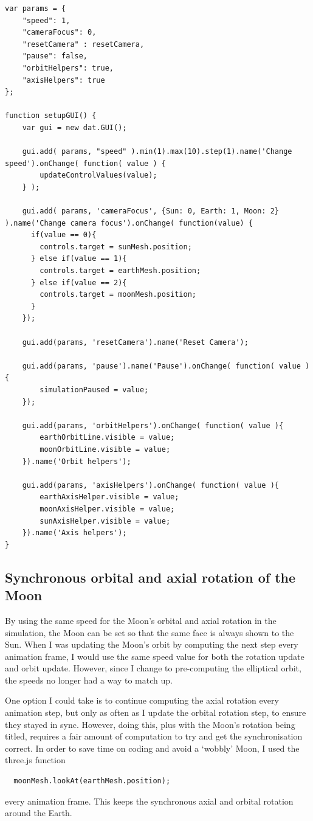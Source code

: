 \documentclass[12pt]{article}
\begin{document}
\begin{lstlisting}
var params = {
    "speed": 1,
    "cameraFocus": 0,
    "resetCamera" : resetCamera,
    "pause": false,
    "orbitHelpers": true,
    "axisHelpers": true
};

function setupGUI() {
    var gui = new dat.GUI();

    gui.add( params, "speed" ).min(1).max(10).step(1).name('Change speed').onChange( function( value ) {
        updateControlValues(value);
    } );

    gui.add( params, 'cameraFocus', {Sun: 0, Earth: 1, Moon: 2} ).name('Change camera focus').onChange( function(value) {
      if(value == 0){
        controls.target = sunMesh.position;
      } else if(value == 1){
        controls.target = earthMesh.position;
      } else if(value == 2){
        controls.target = moonMesh.position;
      }
    });

    gui.add(params, 'resetCamera').name('Reset Camera');

    gui.add(params, 'pause').name('Pause').onChange( function( value ){
        simulationPaused = value;
    });
    
    gui.add(params, 'orbitHelpers').onChange( function( value ){
        earthOrbitLine.visible = value;
        moonOrbitLine.visible = value;
    }).name('Orbit helpers');

    gui.add(params, 'axisHelpers').onChange( function( value ){
        earthAxisHelper.visible = value;
        moonAxisHelper.visible = value;
        sunAxisHelper.visible = value;
    }).name('Axis helpers');    
}
\end{lstlisting}

\subsection{Synchronous orbital and axial rotation of the Moon}
By using the same speed for the Moon's orbital and axial rotation in the simulation, the Moon can be set so that the same face is always shown to the Sun. When I was updating the Moon's orbit by computing the next step every animation frame, I would use the same speed value for both the rotation update and orbit update. However, since I change to pre-computing the elliptical orbit, the speeds no longer had a way to match up.

One option I could take is to continue computing the axial rotation every animation step, but only as often as I update the orbital rotation step, to ensure they stayed in sync. However, doing this, plus with the Moon's rotation being titled, requires a fair amount of computation to try and get the synchronisation correct. In order to save time on coding and avoid a `wobbly' Moon, I used the three.js function 
\begin{lstlisting}
  moonMesh.lookAt(earthMesh.position);\end{lstlisting}
 every animation frame. This keeps the synchronous axial and orbital rotation around the Earth.
 
\end{document}
